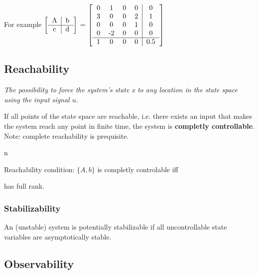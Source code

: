 \documentclass[10pt,a4paper]{scrartcl}
\begin{document}
\begin{multicols*}{3}
	\setlength{\tabcolsep}{1ex}
	For example $\left[\begin{tabular} {c|c} A & b\\ \hline  c & d\end{tabular}\right]$ = $\left[\begin{tabular}{cccc|c}
	0 & 1 & 0 & 0 & 0\\
	3 & 0 & 0 & 2 & 1\\
	0 & 0 & 0 & 1 & 0\\
	0 & -2 & 0 & 0 & 0\\
	\hline
	1 & 0 & 0 & 0 & 0.5
	\end{tabular}\right]$
	
	
	
	
	\subsection{Reachability}

	\emph{The possibility to force the system's state x to any location in the state space using the input signal $u$.}
	
	If all points of the state space are reachable, i.e. there exists an input that makes the system reach any point in finite time, the system is \textbf{completly controllable}. Note: complete reachability is prequisite.
	
	n
	
	Reachability condition: $\{A,b\}$ is completly controlable iff 
	\begin{center}
	\end{center}
		
	has full rank.
	
	

	\subsubsection{Stabilizability}
	
	An (unstable) system is potentially stabilizable if all uncontrollable state variables are asymptotically stable.
	
	\columnbreak
	
	\subsection{Observability}
	

\end{multicols*}
\end{document}
